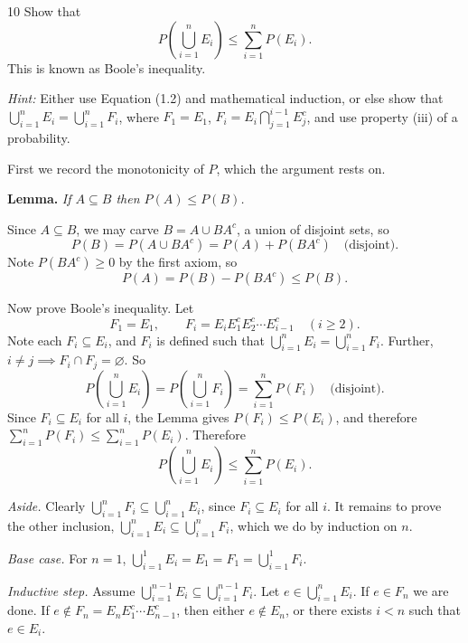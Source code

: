 \documentclass[11pt]{article}
\begin{document}
\begin{problem}{10}
  Show that
  \[
    P\!\left( \bigcup_{i=1}^{n} E_i \right) \leqslant \sum_{i=1}^{n} P(E_i).
  \]
  This is known as Boole's inequality.

  \upshape\emph{Hint:} Either use Equation (1.2) and mathematical induction, or
  else show that $\bigcup_{i=1}^{n} E_i = \bigcup_{i=1}^{n} F_i$, where
  $F_1 = E_1$, $F_i = E_i \bigcap_{j=1}^{i-1} E_j^{c}$, and use property (iii)
  of a probability.
\end{problem}
First we record the monotonicity of $P$, which the argument rests on.

\medskip
\noindent\textbf{Lemma.} \emph{If $A \subseteq B$ then $P(A) \leqslant P(B)$.}

\smallskip
\noindent Since $A \subseteq B$, we may carve $B = A \cup BA^{c}$, a union of
disjoint sets, so
\[
  P(B) = P(A \cup BA^{c}) = P(A) + P(BA^{c})
  \quad \text{(disjoint)} .
\]
Note $P(BA^{c}) \geqslant 0$ by the first axiom, so
\[
  P(A) = P(B) - P(BA^{c}) \leqslant P(B) .
\]

\medskip
\noindent Now prove Boole's inequality. Let
\[
  F_1 = E_1,
  \qquad
  F_i = E_i E_1^{c} E_2^{c} \cdots E_{i-1}^{c}
  \quad (i \geqslant 2).
\]
Note each $F_i \subseteq E_i$, and $F_i$ is defined such that
$\bigcup_{i=1}^{n} E_i = \bigcup_{i=1}^{n} F_i$. Further,
$i \neq j \implies F_i \cap F_j = \varnothing$. So
\[
  P\!\left( \bigcup_{i=1}^{n} E_i \right)
  = P\!\left( \bigcup_{i=1}^{n} F_i \right)
  = \sum_{i=1}^{n} P(F_i)
  \quad \text{(disjoint)} .
\]
Since $F_i \subseteq E_i$ for all $i$, the Lemma gives $P(F_i) \leqslant P(E_i)$, and
therefore $\sum_{i=1}^{n} P(F_i) \leqslant \sum_{i=1}^{n} P(E_i)$. Therefore
\[
  P\!\left( \bigcup_{i=1}^{n} E_i \right) \leqslant \sum_{i=1}^{n} P(E_i) .
\]

\medskip
\noindent\emph{Aside.} Clearly $\bigcup_{i=1}^{n} F_i \subseteq \bigcup_{i=1}^{n} E_i$,
since $F_i \subseteq E_i$ for all $i$. It remains to prove the other inclusion,
$\bigcup_{i=1}^{n} E_i \subseteq \bigcup_{i=1}^{n} F_i$, which we do by induction on
$n$.

\smallskip
\noindent\emph{Base case.} For $n = 1$, $\bigcup_{i=1}^{1} E_i = E_1 = F_1 =
\bigcup_{i=1}^{1} F_i$.

\smallskip
\noindent\emph{Inductive step.} Assume $\bigcup_{i=1}^{n-1} E_i \subseteq
\bigcup_{i=1}^{n-1} F_i$. Let $e \in \bigcup_{i=1}^{n} E_i$. If $e \in F_n$ we are
done. If $e \notin F_n = E_n E_1^{c} \cdots E_{n-1}^{c}$, then either $e \notin E_n$,
or there exists $i < n$ such that $e \in E_i$.
\end{document}
